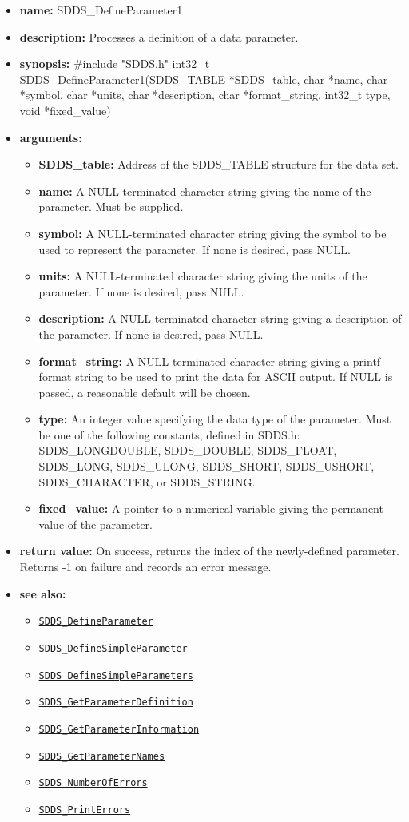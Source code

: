 \documentclass[11pt]{article}
\newcommand{\progref}[1]{\hyperref[SDDS_#1]{\tt SDDS\_#1}}
\begin{document}
\begin{itemize}
\item {\bf name:}\newline
SDDS\_DefineParameter1
\item {\bf description:}\newline
Processes a definition of a data parameter.
\item {\bf synopsis:} \#include "SDDS.h"\newline
int32\_t SDDS\_DefineParameter1(SDDS\_TABLE *SDDS\_table, char *name, char *symbol, char *units, char *description, char *format\_string, int32\_t type, void *fixed\_value)
\item {\bf arguments:}
\begin{itemize}
\item {\bf SDDS\_table:} Address of the SDDS\_TABLE structure for the data set.
\item {\bf name:} A NULL-terminated character string giving the name of the parameter. Must be supplied.
\item {\bf symbol:} A NULL-terminated character string giving the symbol to be used to represent the parameter. If none is desired, pass NULL.
\item {\bf units:} A NULL-terminated character string giving the units of the parameter. If none is desired, pass NULL.
\item {\bf description:} A NULL-terminated character string giving a description of the parameter. If none is desired, pass NULL.
\item {\bf format\_string:} A NULL-terminated character string giving a  printf format string to be used to print the data for ASCII output. If NULL is passed, a reasonable default will be chosen.
\item {\bf type:} An integer value specifying the data type of the parameter. Must be one of the following constants, defined in  SDDS.h: SDDS\_LONGDOUBLE, SDDS\_DOUBLE, SDDS\_FLOAT, SDDS\_LONG, SDDS\_ULONG, SDDS\_SHORT, SDDS\_USHORT, SDDS\_CHARACTER, or SDDS\_STRING.
\item {\bf fixed\_value:} A pointer to a numerical variable giving the permanent value of the parameter.
\end{itemize}
\item {\bf return value:}\newline
On success, returns the index of the newly-defined parameter. Returns -1 on failure and records an error message.
\item {\bf see also:}
\begin{itemize}
\item \progref{DefineParameter}
\item \progref{DefineSimpleParameter}
\item \progref{DefineSimpleParameters}
\item \progref{GetParameterDefinition}
\item \progref{GetParameterInformation}
\item \progref{GetParameterNames}
\item \progref{NumberOfErrors}
\item \progref{PrintErrors}
\end{itemize}
\end{itemize}
\end{document}

